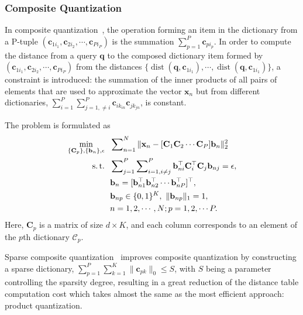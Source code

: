 \documentclass[10pt,journal,compsoc]{IEEEtran}
\begin{document}
\subsubsection{Composite Quantization}
In composite quantization~\cite{ZhangDW14},
the operation forming an item in the dictionary
from a P-tuple $(\mathbf{c}_{1i_1}, \mathbf{c}_{2i_2}, \cdots, \mathbf{c}_{Pi_P})$
is the summation $\sum_{p=1}^P\mathbf{c}_{pi_p}$.
In order to
compute the distance from a query $\mathbf{q}$
to the composed dictionary item formed
by $(\mathbf{c}_{1i_1}, \mathbf{c}_{2i_2}, \cdots, \mathbf{c}_{Pi_P})$
from the distances
$\{\operatorname{dist}(\mathbf{q}, \mathbf{c}_{1i_1}), \cdots,
\operatorname{dist}(\mathbf{q}, \mathbf{c}_{1i_1})\}$,
a constraint is introduced:
the summation of the inner products of all
pairs of elements that are used to approximate the vector $\mathbf{x}_n$
but from different dictionaries,
$\sum_{i=1}^P\sum_{j=1, \neq i}^P \mathbf{c}_{ik_{in}} \mathbf{c}_{jk_{jn}}$,
is constant.

The problem is formulated as
\begin{align}\small
\min_{\{\mathbf{C}_p\},\{\mathbf{b}_n\}, \epsilon } ~&~\sum\nolimits_{n=1}^N\|\mathbf{x}_n -  [\mathbf{C}_1 \mathbf{C}_2 \cdots \mathbf{C}_P]\mathbf{b}_{n}\|_2^2 \label{eqn:originalobjectivefunction} \\
\operatorname{s.t.}
~&~ \sum\nolimits_{j=1}^P \sum\nolimits_{i=1, i\neq j}^P  \mathbf{b}_{ni}^\top \mathbf{C}_{i}^\top\mathbf{C}_{j}\mathbf{b}_{nj} = \epsilon ,\nonumber \\
~&~ \mathbf{b}_n  = [\mathbf{b}_{n1}^\top\mathbf{b}_{n2}^\top\cdots\mathbf{b}_{nP}^\top]^\top, \nonumber \\
~&~ \mathbf{b}_{np} \in \{0, 1\}^K,~\|\mathbf{b}_{np}\|_1 = 1 ,\nonumber \\
~&~ n=1,2,\cdots,N; p=1,2, \cdots P.\nonumber
\end{align}
Here, ${\mathbf{C}_p}$ is a matrix of size $d \times K$,
and each column corresponds to an element
of the $p$th dictionary $\mathcal{C}_p$.

Sparse composite quantization~\cite{ZhangQTW15} improves composite quantization
by constructing a sparse dictionary,
$\sum_{p=1}^P\sum_{k=1}^K \|\mathbf{c}_{pk}\|_0 \leqslant S$,
with $S$ being a parameter controlling the sparsity degree,
resulting in a great reduction of the distance table computation cost
which takes almost the same as the most efficient approach: product quantization.
\end{document}
